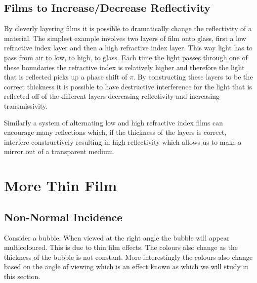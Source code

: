     \subsection{Films to Increase/Decrease Reflectivity}
    By cleverly layering films it is possible to dramatically change the reflectivity of a material.
    The simplest example involves two layers of film onto glass, first a low refractive index layer and then a high refractive index layer.
    This way light has to pass from air to low, to high, to glass.
    Each time the light passes through one of these boundaries the refractive index is relatively higher and therefore the light that is reflected picks up a phase shift of \(\pi\).
    By constructing these layers to be the correct thickness it is possible to have destructive interference for the light that is reflected off of the different layers decreasing reflectivity and increasing transmissivity.
    
    Similarly a system of alternating low and high refractive index films can encourage many reflections which, if the thickness of the layers is correct, interfere constructively resulting in high reflectivity which allows us to make a mirror out of a transparent medium.
    
    \section{More Thin Film}
    \subsection{Non-Normal Incidence}
    Consider a bubble.
    When viewed at the right angle the bubble will appear multicoloured.
    This is due to thin film effects.
    The colours also change as the thickness of the bubble is not constant.
    More interestingly the colours also change based on the angle of viewing which is an effect known as  which we will study in this section.
    
